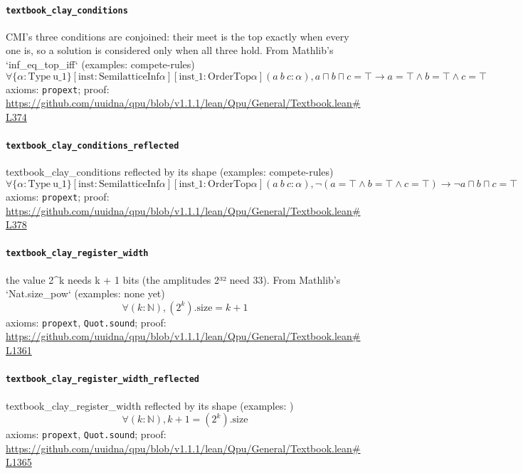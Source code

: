 \documentclass[11pt]{article}
\begin{document}
\paragraph{\texttt{textbook\_clay\_conditions}}
CMI's three conditions are conjoined: their meet is the top exactly when every one is, so a solution is considered only when all three hold. From Mathlib's `inf\_eq\_top\_iff` (examples: compete-rules)
\[ \forall \{\alpha : \mathrm{Type}\ \mathrm{u\_1}\} [\mathrm{inst} : \mathrm{SemilatticeInf} \alpha ] [\mathrm{inst\_1} : \mathrm{OrderTop} \alpha ] (a\ b\ c : \alpha ), a \sqcap b \sqcap c = \top \to a = \top \land b = \top \land c = \top  \]
\noindent axioms: \texttt{propext}; proof: \url{https://github.com/uuidna/qpu/blob/v1.1.1/lean/Qpu/General/Textbook.lean\#L374}

\paragraph{\texttt{textbook\_clay\_conditions\_reflected}}
textbook\_clay\_conditions reflected by its shape (examples: compete-rules)
\[ \forall \{\alpha : \mathrm{Type}\ \mathrm{u\_1}\} [\mathrm{inst} : \mathrm{SemilatticeInf} \alpha ] [\mathrm{inst\_1} : \mathrm{OrderTop} \alpha ] (a\ b\ c : \alpha ), \neg (a = \top \land b = \top \land c = \top ) \to \neg a \sqcap b \sqcap c = \top  \]
\noindent axioms: \texttt{propext}; proof: \url{https://github.com/uuidna/qpu/blob/v1.1.1/lean/Qpu/General/Textbook.lean\#L378}

\paragraph{\texttt{textbook\_clay\_register\_width}}
the value 2\^{}k needs k + 1 bits (the amplitudes 2³² need 33). From Mathlib's `Nat.size\_pow` (examples: none yet)
\[ \forall (k : \mathbb{N}), (2 ^{k})\mathrm{.size} = k + 1 \]
\noindent axioms: \texttt{propext}, \texttt{Quot.sound}; proof: \url{https://github.com/uuidna/qpu/blob/v1.1.1/lean/Qpu/General/Textbook.lean\#L1361}

\paragraph{\texttt{textbook\_clay\_register\_width\_reflected}}
textbook\_clay\_register\_width reflected by its shape (examples: )
\[ \forall (k : \mathbb{N}), k + 1 = (2 ^{k})\mathrm{.size} \]
\noindent axioms: \texttt{propext}, \texttt{Quot.sound}; proof: \url{https://github.com/uuidna/qpu/blob/v1.1.1/lean/Qpu/General/Textbook.lean\#L1365}
\end{document}
